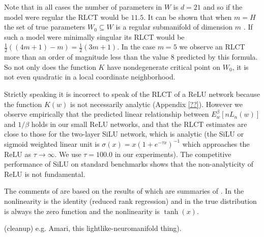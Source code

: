 \documentclass{article} %
\begin{document}
Note that in all cases the number of parameters in $W$ is $d = 21$ and so if the model were regular the RLCT would be $11.5$. It can be shown that when $m = H$ the set of true parameters $W_0 \subseteq W$ is a regular submanifold of dimension $m$ \cite{??}. If such a model were minimally singular its RLCT would be $\tfrac{1}{2}( (4m + 1) - m ) = \tfrac{1}{2}( 3m + 1 )$. In the case $m = 5$ we observe an RLCT more than an order of magnitude less than the value $8$ predicted by this formula. So not only does the function $K$ have nondegenerate critical point on $W_0$, it is not even quadratic in a local coordinate neighborhood.

Strictly speaking it is incorrect to speak of the RLCT of a ReLU network because the function $K(w)$ is not necessarily analytic (Appendix \ref{??}). However we observe empirically that the predicted linear relationship between $E^\beta_w[nL_n(w)]$ and $1/\beta$ holds in our small ReLU networks, and that the RLCT estimates are close to those for the two-layer SiLU network, which is analytic (the SiLU or sigmoid weighted linear unit is $\sigma(x) = x (1 + e^{-\tau x})^{-1}$ which approaches the ReLU as $\tau \to \infty$. We use $\tau = 100.0$ in our experiments). The competitive performance of SiLU on standard benchmarks \cite{??} shows that the non-analyticity of ReLU is not fundamental.

\begin{remark} The comments of \citet[\S 7.6]{watanabe_algebraic_2009} are based on the results of \citet[\S 7.2]{watanabe_algebraic_2009} which are summaries of \cite{??,??}. In \cite{??} the nonlinearity is the identity (reduced rank regression) and in \cite{??} the true distribution is always the zero function and the nonlinearity is $\operatorname{tanh}(x)$.
\end{remark}


\begin{remark} (cleanup)
e.g. Amari, this lightlike-neuromanifold thing).
\end{remark}
\end{document}
